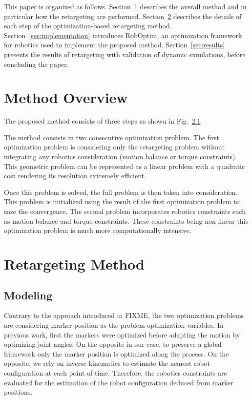 \documentclass[letterpaper, 10 pt, conference]{ieeeconf}  %
\begin{document}
This paper is organized as follows. Section~\ref{sec:overview}
describes the overall method and in particular how the retargeting
are performed. Section~\ref{sec:retargeting} describes the
details of each step of the optimization-based retargeting method.
Section~\ref{sec:implementation} introduces 
RobOptim, an optimization framework for robotics used to implement the
proposed method. Section~\ref{sec:results} presents the results of
retargeting with validation of dynamic simulations, before concluding
the paper.

\section{Method Overview}
\label{sec:overview}

The proposed method consists of three steps as shown in Fig.~\ref{}

The method consists in two consecutive optimization problem. The first
optimization problem is considering only the retargeting problem
without integrating any robotics consideration (motion balance or
torque constraints). This geometric problem can be represented as a
linear problem with a quadratic cost rendering its resolution
extremely efficient.

Once this problem is solved, the full problem is then taken into
consideration. This problem is initialized using the result of the
first optimization problem to ease the convergence. The second problem
incorporates robotics constraints such as motion balance and torque
constraints. These constraints being non-linear this optimization
problem is much more computationally intensive.



\section{Retargeting Method}
\label{sec:retargeting}

\subsection{Modeling}

Contrary to the approach introduced in FIXME, the two optimization
problems are considering marker position as the problem optimization
variables. In previous work, first the markers were optimized before
adapting the motion by optimizing joint angles. On the opposite in our
case, to preserve a global framework only the marker position is
optimized along the process. On the opposite, we rely on inverse
kinematics to estimate the nearest robot configuration at each point
of time. Therefore, the robotics constraints are evaluated for the
estimation of the robot configuration deduced from marker positions.
\end{document}
